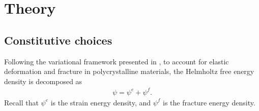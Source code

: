 \section{Theory}
\label{section: brittle/theory}

\subsection{Constitutive choices}
\label{section: Chapter3/theory/constitutive}

Following the variational framework presented in , to account for elastic deformation and fracture in polycrystalline materials, the Helmholtz free energy density is decomposed as
\begin{align}
  \psi = \psi^e + \psi^f. \label{eq: chapter 3 helmholtz}
\end{align}
Recall that $\psi^e$ is the strain energy density, and $\psi^f$ is the fracture energy density.

